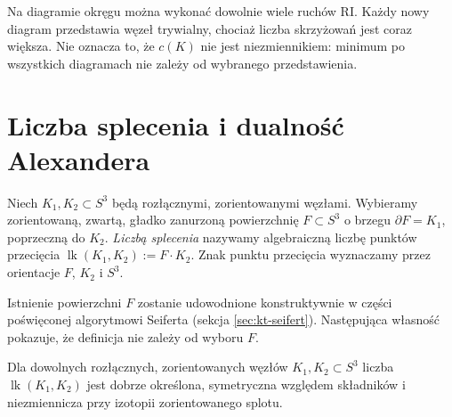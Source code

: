 \begin{przyklad}
Na diagramie okręgu można wykonać dowolnie wiele ruchów $\mathrm{R I}$.
Każdy nowy diagram przedstawia węzeł trywialny, chociaż liczba
skrzyżowań jest coraz większa. Nie oznacza to, że $c(K)$ nie jest
niezmiennikiem: minimum po wszystkich diagramach nie zależy od
wybranego przedstawienia.
\end{przyklad}

\section{Liczba splecenia i dualność Alexandera}
\label{sec:kt-linking}

\begin{definicja}
Niech $K_1,K_2\subset S^3$ będą rozłącznymi, zorientowanymi węzłami.
Wybieramy zorientowaną, zwartą, gładko zanurzoną powierzchnię
$F\subset S^3$ o brzegu $\partial F=K_1$, poprzeczną do $K_2$.
\emph{Liczbą splecenia} nazywamy algebraiczną liczbę punktów
przecięcia $\operatorname{lk}(K_1,K_2):=F\cdot K_2$.
Znak punktu przecięcia wyznaczamy przez orientacje $F$, $K_2$ i $S^3$.
\end{definicja}

Istnienie powierzchni $F$ zostanie udowodnione konstruktywnie
w części poświęconej algorytmowi Seiferta (sekcja \ref{sec:kt-seifert}).
Następująca własność
pokazuje, że definicja nie zależy od wyboru $F$.

\begin{stwierdzenie}
Dla dowolnych rozłącznych, zorientowanych węzłów
$K_1,K_2\subset S^3$ liczba $\operatorname{lk}(K_1,K_2)$ jest
dobrze określona, symetryczna względem składników i niezmiennicza
przy izotopii zorientowanego splotu.
\end{stwierdzenie}

